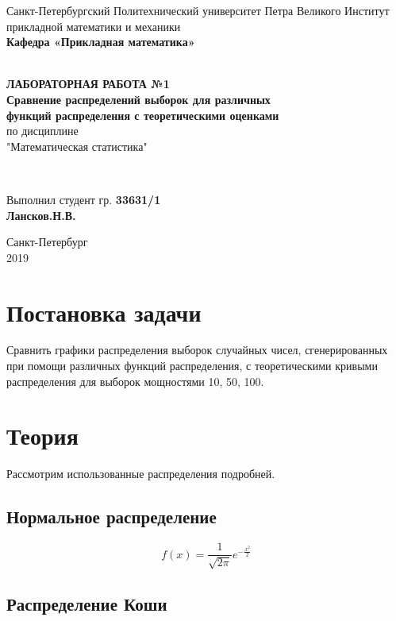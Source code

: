 \documentclass[12pt]{article}
\begin{document}
\begin{titlepage}
	\center
		Санкт-Петербургский Политехнический 
		университет Петра Великого
		Институт прикладной математики и механики
		\\ \textbf{Кафедра «Прикладная математика»}

	\vfill ~
	\textbf{
		\\ \large ЛАБОРАТОРНАЯ РАБОТА №1
		\\	\normalsize	
			Сравнение распределений выборок для различных 
		\\	функций распределения с теоретическими оценками
	}
	\\	по дисциплине 
	\\	"Математическая статистика"

	\vfill ~

	Выполнил студент гр. \textbf{33631/1} \\
	\textbf{Лансков.Н.В.} \\ 

\vfill

{\large}	Санкт-Петербург
\\ 2019
\end{titlepage}

\tableofcontents
\pagebreak
\listoffigures
\pagebreak


\section{Постановка задачи}
Сравнить графики распределения выборок случайных чисел, сгенерированных при помощи различных функций распределения, с теоретическими кривыми распределения для выборок мощностями 10, 50, 100.

\section{Теория}
Рассмотрим использованные распределения подробней.

\subsection{Нормальное распределение}

\begin{equation}
f(x)= \frac{1}{\sqrt{2\pi}}e^{-\frac{x^2}{2}}
\end{equation}

\subsection{Распределение Коши}
\end{document}
